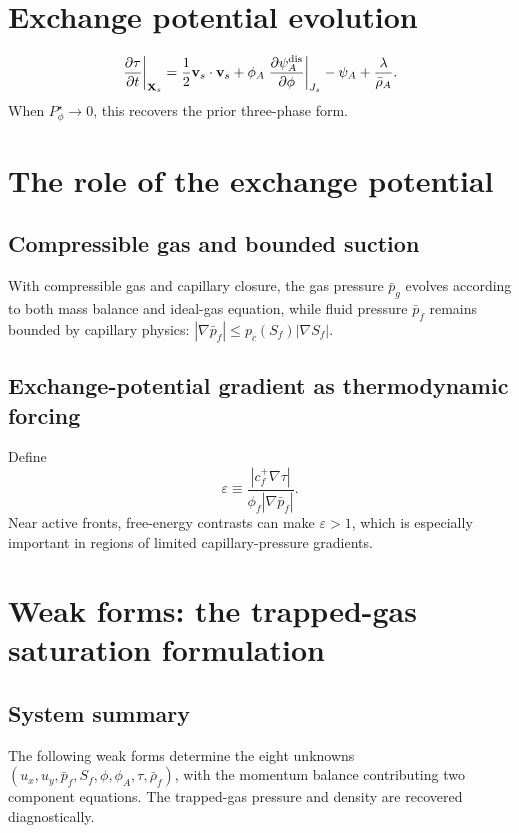 \documentclass[11pt]{article}
\begin{document}
\section{Exchange potential evolution}
\label{sec:tau}

\begin{equation}
\left.\frac{\partial\tau}{\partial t}\right|_{\mathbf{X}_s}=\frac12\mathbf{v}_s\cdot\mathbf{v}_s+\phi_A\left.\frac{\partial\psi_A^{\mathrm{dis}}}{\partial\phi}\right|_{J_s}-\psi_A+\frac{\lambda}{\bar\rho_A}.
\label{eq:tau_evolution}
\end{equation}
When $P_\phi^\star\to0$, this recovers the prior three-phase form.

\section{The role of the exchange potential}
\label{sec:tau_role}

\subsection{Compressible gas and bounded suction}
With compressible gas and capillary closure, the gas pressure $\bar p_g$ evolves according to both mass balance and ideal-gas equation, while fluid pressure $\bar p_f$ remains bounded by capillary physics: $|\nabla \bar p_f| \le p_c(S_f)|\nabla S_f|$.

\subsection{Exchange-potential gradient as thermodynamic forcing}
Define
\begin{equation}
\varepsilon\equiv\frac{|c_f^+\nabla\tau|}{\phi_f|\nabla \bar p_f|}.
\label{eq:epsilon}
\end{equation}
Near active fronts, free-energy contrasts can make $\varepsilon>1$, which is especially important in regions of limited capillary-pressure gradients.

\section{Weak forms: the trapped-gas saturation formulation}
\label{sec:weak_forms}

\subsection{System summary}
The following weak forms determine the eight unknowns $(u_x, u_y, \bar p_f, S_f, \phi, \phi_A, \tau, \bar\rho_f)$, with the momentum balance contributing two component equations. The trapped-gas pressure and density are recovered diagnostically.
\end{document}
